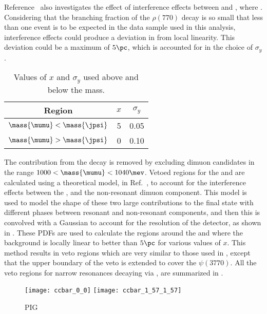 Reference~\cite{Williams:2015xfa} also investigates the effect of interference effects between
\btokstrmumu and , where .
Considering that the branching fraction of the $\rho(770)$ decay is so small that less than one
event is to be expected in the data sample used in this analysis, interference effects could
produce a deviation in from local linearity.
This deviation could be a maximum of $5\pc$, which is accounted for in the choice of $\sigma_y$.

\begin{table}
  \caption[Values of $x$ and $\sigma_y$ used]
  {
    Values of $x$ and $\sigma_y$ used above and below the \jpsi mass.
  }
  \label{tab:db:xsigmay}
  \begin{center}
    \begin{tabular}{ccc}\toprule
      Region & $x$ & $\sigma_y$ \\\midrule
      $\mass{\mumu}<\mass{\jpsi}$ & 5 & 0.05 \\
      $\mass{\mumu}>\mass{\jpsi}$ & 0 & 0.10 \\
      \bottomrule
    \end{tabular}
  \end{center}
\end{table}

The contribution from the decay \decay{\phi}{\mumu} is removed by excluding dimuon candidates in
the range $1000<\mass{\mumu}<1040\mev$.
Vetoed regions for the \jpsi and \psitwos are calculated using a theoretical model, in
Ref.~\cite{Bobeth:2011nj}, to account for the interference effects between the \jpsi, \psitwos and
the non-resonant dimuon component.
This model is used to model the shape of these two large \ccbar contributions to the \mumu final
state with different phases between resonant and non-resonant components, and then this is
convolved with a Gaussian to account for the resolution of the \lhcb detector, as shown in
.
These \glspl{PDF} are used to calculate the regions around the \jpsi and \psitwos where the
background is locally linear to better than $5\pc$ for various values of $x$.
This method results in veto regions which are very similar to those used in
, except that the upper boundary of the \psitwos veto is extended to cover
the $\psi(3770)$.
All the veto regions for narrow resonances decaying via , are summarized in
.

\begin{figure}
  \begin{center}
    \texttt{[image: ccbar\_0\_0]}
    \texttt{[image: ccbar\_1\_57\_1\_57]}
    \caption{
      PIG
    }
    \label{fig:db:ccbar}
  \end{center}
\end{figure}


